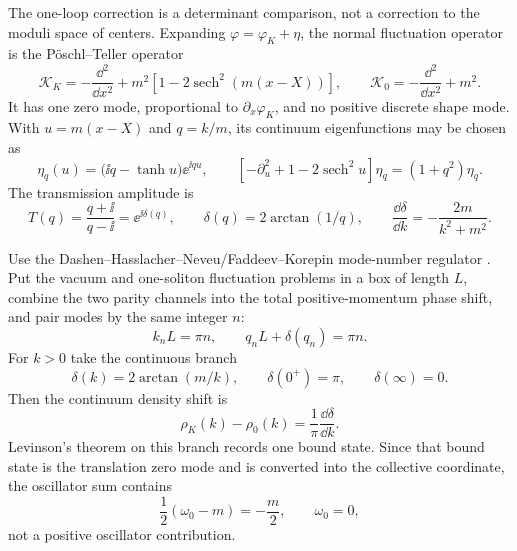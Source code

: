 The one-loop correction is a determinant comparison, not a correction to the
moduli space of centers.  Expanding
\(\varphi=\varphi_K+\eta\), the normal fluctuation operator is the
Pöschl--Teller operator
\begin{equation}
  \mathcal K_K
  =
  -\frac{\dd^2}{\dd x^2}
  +m^2\left[1-2\operatorname{sech}^2(m(x-X))\right],
  \qquad
  \mathcal K_0=-\frac{\dd^2}{\dd x^2}+m^2 .
  \label{eq:sine-gordon-kink-fluctuation-operator}
\end{equation}
It has one zero mode, proportional to \(\partial_x\varphi_K\), and no positive
discrete shape mode.  With \(u=m(x-X)\) and \(q=k/m\), its continuum
eigenfunctions may be chosen as
\[
  \eta_q(u)=\bigl(\ii q-\tanh u\bigr)\ee^{\ii q u},
  \qquad
  \left[-\partial_u^2+1-2\operatorname{sech}^2u\right]\eta_q
  =
  (1+q^2)\eta_q .
\]
The transmission amplitude is
\begin{equation}
  T(q)=\frac{q+\ii}{q-\ii}=\ee^{\ii\delta(q)},
  \qquad
  \delta(q)=2\arctan(1/q),
  \qquad
  \frac{\dd\delta}{\dd k}
  =
  -\frac{2m}{k^2+m^2}.
  \label{eq:sine-gordon-kink-phase-shift}
\end{equation}

Use the Dashen--Hasslacher--Neveu/Faddeev--Korepin mode-number regulator
\cite{DashenHasslacherNeveu1975,FaddeevKorepin1978}.  Put the vacuum and
one-soliton fluctuation problems in a box of length \(L\), combine the two
parity channels into the total positive-momentum phase shift, and pair modes
by the same integer \(n\):
\[
  k_nL=\pi n,
  \qquad
  q_nL+\delta(q_n)=\pi n .
\]
For \(k>0\) take the continuous branch
\[
  \delta(k)=2\arctan(m/k),
  \qquad
  \delta(0^+)=\pi,
  \qquad
  \delta(\infty)=0 .
\]
Then the continuum density shift is
\[
  \rho_K(k)-\rho_0(k)=\frac1\pi\frac{\dd\delta}{\dd k}.
\]
Levinson's theorem on this branch records one bound state.  Since that bound
state is the translation zero mode and is converted into the collective
coordinate, the oscillator sum contains
\[
  \frac12(\omega_0-m)=-\frac m2,
  \qquad \omega_0=0,
\]
not a positive oscillator contribution.

